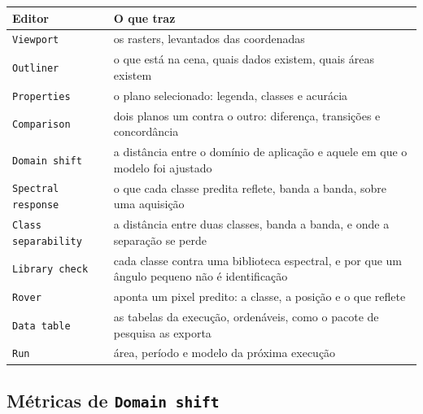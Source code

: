 \documentclass[12pt,a4paper]{article}
\begin{document}
\begin{center}
\label{tab:editores}
\small
\renewcommand{\arraystretch}{1.18}
\begin{tabular}{@{}L{3.9cm}L{11.7cm}@{}}
\toprule
\textbf{Editor} & \textbf{O que traz} \\
\midrule
\texttt{Viewport} & os rasters, levantados das coordenadas \\
\texttt{Outliner} & o que est\'a na cena, quais dados existem, quais \'areas existem \\
\texttt{Properties} & o plano selecionado: legenda, classes e acur\'acia \\
\texttt{Comparison} & dois planos um contra o outro: diferen\c{c}a, transi\c{c}\~oes e concord\^ancia \\
\texttt{Domain shift} & a dist\^ancia entre o dom\'inio de aplica\c{c}\~ao e aquele em que o modelo foi ajustado \\
\texttt{Spectral response} & o que cada classe predita reflete, banda a banda, sobre uma aquisi\c{c}\~ao \\
\texttt{Class separability} & a dist\^ancia entre duas classes, banda a banda, e onde a separa\c{c}\~ao se perde \\
\texttt{Library check} & cada classe contra uma biblioteca espectral, e por que um \^angulo pequeno n\~ao \'e identifica\c{c}\~ao \\
\texttt{Rover} & aponta um pixel predito: a classe, a posi\c{c}\~ao e o que reflete \\
\texttt{Data table} & as tabelas da execu\c{c}\~ao, orden\'aveis, como o pacote de pesquisa as exporta \\
\texttt{Run} & \'area, per\'iodo e modelo da pr\'oxima execu\c{c}\~ao \\
\bottomrule
\end{tabular}
\end{center}

\subsection{M\'etricas de \texttt{Domain shift}}
\end{document}
